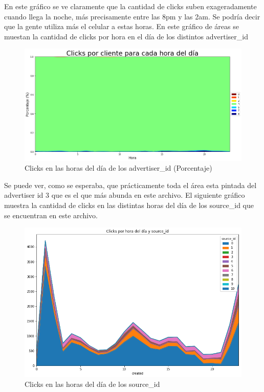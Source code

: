 \documentclass[a4paper, 12pt]{article}
\begin{document}
		
		 En este gráfico se ve claramente que la cantidad de clicks suben exageradamente cuando llega la noche, más precisamente entre las 8pm y las 2am. Se podría decir que la gente utiliza más el celular a estas horas.
		\newline
		\newline
		 En este gráfico de áreas se muestan la cantidad de clicks por hora en el día de los distintos advertiser\_id
	

		\begin{figure}[H]
			\centering
			\includegraphics[scale=0.37]{images/clicks/clicks_advertiser_id_hours_persentage.png}
			\caption{Clicks en las horas del día de los advertiser\_id (Porcentaje)}
		\end{figure}




		 Se puede ver, como se esperaba, que prácticamente toda el área esta pintada del advertiser id 3 que es el que más abunda en este archivo.
		\newline
		\newline
		 El siguiente gráfico muestra la cantidad de clicks en las distintas horas del día de los source\_id que se encuentran en este archivo.


		\begin{figure}[H]
			\centering
			\includegraphics[width=\textwidth]{images/clicks/clicks_source_id_hours.png}
			\caption{Clicks en las horas del día de los source\_id}
		\end{figure}
\end{document}
